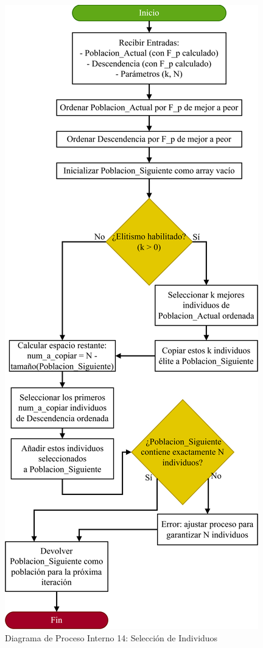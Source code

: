 \begin{figure}[H]
    \centering
    \includegraphics[width=\textwidth]{img/Analisis/DiagramaProcesos/DiagramaProceso14_SeleccionIndividuos.png}
    \caption{Diagrama de Proceso Interno 14: Selección de Individuos}%
    \label{fig:process_diagram14}
\end{figure}

